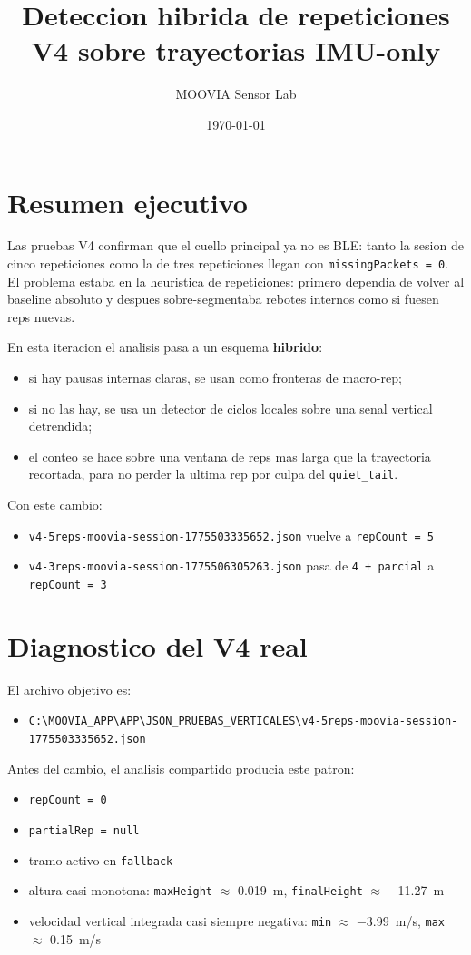 ﻿\documentclass[11pt,a4paper]{article}
\title{Deteccion hibrida de repeticiones V4 sobre trayectorias IMU-only}
\author{MOOVIA Sensor Lab}
\date{\today}
\begin{document}
\maketitle

\section*{Resumen ejecutivo}
Las pruebas V4 confirman que el cuello principal ya no es BLE: tanto la sesion de cinco repeticiones como la de tres repeticiones llegan con \texttt{missingPackets = 0}. El problema estaba en la heuristica de repeticiones: primero dependia de volver al baseline absoluto y despues sobre-segmentaba rebotes internos como si fuesen reps nuevas.

En esta iteracion el analisis pasa a un esquema \textbf{hibrido}:
\begin{itemize}[leftmargin=14pt]
  \item si hay pausas internas claras, se usan como fronteras de macro-rep;
  \item si no las hay, se usa un detector de ciclos locales sobre una senal vertical detrendida;
  \item el conteo se hace sobre una ventana de reps mas larga que la trayectoria recortada, para no perder la ultima rep por culpa del \texttt{quiet\_tail}.
\end{itemize}

Con este cambio:
\begin{itemize}[leftmargin=14pt]
  \item \texttt{v4-5reps-moovia-session-1775503335652.json} vuelve a \texttt{repCount = 5}
  \item \texttt{v4-3reps-moovia-session-1775506305263.json} pasa de \texttt{4 + parcial} a \texttt{repCount = 3}
\end{itemize}

\section{Diagnostico del V4 real}
El archivo objetivo es:
\begin{itemize}[leftmargin=14pt]
  \item \texttt{C:\textbackslash MOOVIA\_APP\textbackslash APP\textbackslash JSON\_PRUEBAS\_VERTICALES\textbackslash v4-5reps-moovia-session-1775503335652.json}
\end{itemize}

Antes del cambio, el analisis compartido producia este patron:
\begin{itemize}[leftmargin=14pt]
  \item \texttt{repCount = 0}
  \item \texttt{partialRep = null}
  \item tramo activo en \texttt{fallback}
  \item altura casi monotona: \texttt{maxHeight} $\approx$ \SI{0,019}{m}, \texttt{finalHeight} $\approx$ \SI{-11,27}{m}
  \item velocidad vertical integrada casi siempre negativa: \texttt{min} $\approx$ \SI{-3,99}{m/s}, \texttt{max} $\approx$ \SI{0,15}{m/s}
\end{itemize}
\end{document}
